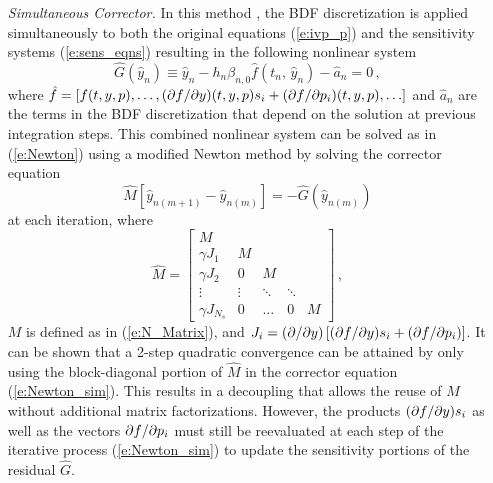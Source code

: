 \begin{itemize}
\item[{\em Simultaneous Corrector.}] 
  In this method \cite{MaPe:97}, the BDF discretization is applied simultaneously
  to both the original equations (\ref{e:ivp_p}) and the sensitivity systems
  (\ref{e:sens_eqns}) resulting in the following nonlinear system 
  \begin{equation*}
    {\hat G}({\hat y}_n) \equiv  
    {\hat y}_n - h_n\beta_{n,0} {\hat f}(t_n,\,{\hat y}_n) - {\hat a}_n = 0 \, ,
  \end{equation*}
  where
  ${\hat f} = [ f(t,y,p), \ldots , (\partial f / \partial y)(t,y,p) s_i + (\partial f / \partial p_i)(t,y,p) , \ldots ]$
  and ${\hat a}_n$ are the terms in the BDF discretization that depend on the
  solution at previous integration steps.
  This combined nonlinear system can be solved as in (\ref{e:Newton}) using
  a modified Newton method by solving the corrector equation
  \begin{equation}\label{e:Newton_sim}
    {\hat M}[{\hat y}_{n(m+1)}-{\hat y}_{n(m)}]=-{\hat G}({\hat y}_{n(m)})
  \end{equation}
  at each iteration, where 
  \begin{equation*}
    {\hat M} = 
    \begin{bmatrix}
      M              &        &        &        &   \\
      \gamma J_1     & M      &        &        &   \\
      \gamma J_2     & 0      & M      &        &   \\
      \vdots         & \vdots & \ddots & \ddots &   \\
      \gamma J_{N_s} & 0      & \ldots & 0      & M 
    \end{bmatrix} \, ,
  \end{equation*}
  $M$ is defined as in (\ref{e:N_Matrix}), and 
  $J_i = ({\partial}/{\partial y})\left[ (\partial f / \partial y) s_i + (\partial f / \partial p_i) \right]$.
  It can be shown that a 2-step quadratic convergence can be attained by only
  using the block-diagonal portion of ${\hat M}$ in the corrector equation
  (\ref{e:Newton_sim}). This results in a decoupling that allows the reuse of 
  $M$ without additional matrix factorizations. However, the products
  $(\partial f / \partial y)s_i$ as well as the vectors $\partial f / \partial p_i$ must still be reevaluated at 
  each step of the iterative process (\ref{e:Newton_sim}) to update the 
  sensitivity portions of the residual ${\hat G}$.
  

\end{itemize}
